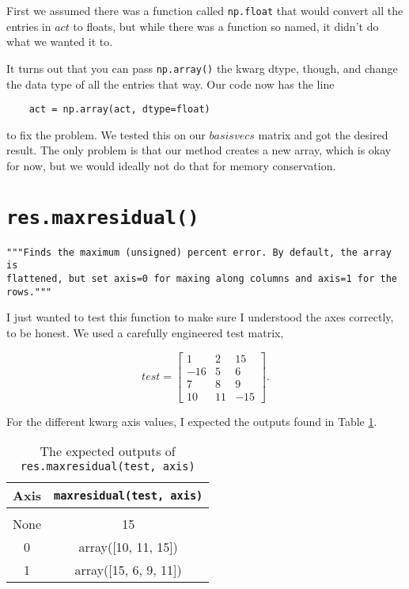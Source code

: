\documentclass{article}
\begin{document}
First we assumed there was a function called \verb|np.float| that
would convert all the entries in $act$ to floats, but while there was
a function so named, it didn't do what we wanted it to.

It turns out that you can pass \verb|np.array()| the kwarg dtype,
though, and change the data type of all the entries that way.  Our
code now has the line

\begin{verbatim}
    act = np.array(act, dtype=float)
\end{verbatim}
to fix the problem.  We tested this on our $basisvecs$ matrix and got
the desired result.  The only problem is that our method creates a new
array, which is okay for now, but we would ideally not do that for
memory conservation. 


\section{\texttt{res.maxresidual()}}
\label{sec:maxresidual}
\begin{verbatim}
"""Finds the maximum (unsigned) percent error. By default, the array is
flattened, but set axis=0 for maxing along columns and axis=1 for the
rows."""
\end{verbatim}

I just wanted to test this function to make sure I understood the axes
correctly, to be honest.  We used a carefully engineered test matrix,

\[test= \left[ \begin{array}{ccc}
1 & 2 & 15 \\
-16 & 5 & 6 \\
7 & 8 & 9 \\
10 & 11 & -15
\end{array} \right]. \]

For the different kwarg axis values, I expected the outputs found in
Table \ref{tab:axes}.

\begin{table}
  \centering
  \begin{tabular}[c]{|c|c|}
    \hline\hline
    Axis & \verb|maxresidual(test, axis)| \\
    \hline \\ [-1.5ex]
    None & 15 \\ [1ex]
    0 & array([10, 11, 15]) \\ [1ex]
    1 & array([15, 6, 9, 11]) \\ [1ex]
    \hline
  \end{tabular}
  \caption{The expected outputs of \texttt{res.maxresidual(test,
      axis)}}
\label{tab:axes}
\end{table}
\end{document}
